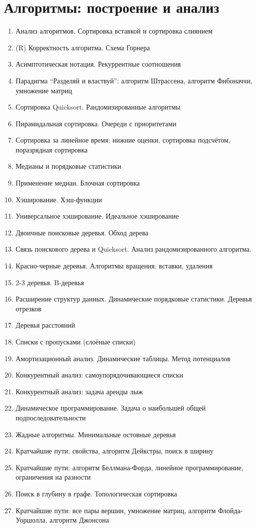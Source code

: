 \documentclass[a4paper,10pt]{article}
\begin{document}
\section*{Алгоритмы: построение и анализ}
\begin{enumerate}
\item Анализ алгоритмов. Сортировка вставкой и сортировка слиянием
\item (R) Корректность алгоритма. Схема Горнера
\item Асимптотическая нотация. Рекуррентные соотношения
\item Парадигма ``Разделяй и властвуй'': алгоритм Штрассена, алгоритм Фибоначчи, умножение матриц
\item Сортировка Quicksort. Рандомизированные алгоритмы
\item Пирамидальная сортировка. Очереди с приоритетами
\item Сортировка за линейное время: нижние оценки, сортировка подсчётом, поразрядная сортировка
\item Медианы и порядковые статистики
\item Применение медиан. Блочная сортировка
\item Хэширование. Хэш-функции
\item Универсальное хэширование. Идеальное хэширование
\item Двоичные поисковые деревья. Обход дерева
\item Связь поискового дерева и Quicksort. Анализ рандомизированного алгоритма.
\item Красно-черные деревья. Алгоритмы вращения, вставки, удаления
\item 2-3 деревья. B-деревья
\item Расширение структур данных. Динамические порядковые статистики. Деревья отрезков
\item Деревья расстояний
\item Списки с пропусками (слоёные списки)
\item Амортизационный анализ. Динамические таблицы. Метод потенциалов
\item Конкурентный анализ: самоупорядочивающиеся списки
\item Конкурентный анализ: задача аренды лыж
\item Динамическое программирование. Задача о наибольшей общей подпоследовательности
\item Жадные алгоритмы. Минимальные остовные деревья
\item Кратчайшие пути: свойства, алгоритм Дейкстры, поиск в ширину
\item Кратчайшие пути: алгоритм Беллмана-Форда, линейное программирование, ограничения на разности
\item Поиск в глубину в графе. Топологическая сортировка
\item Кратчайшие пути: все пары вершин, умножение матриц, алгоритм Флойда-Уоршолла, алгоритм Джонсона
\end{enumerate}
\end{document}
